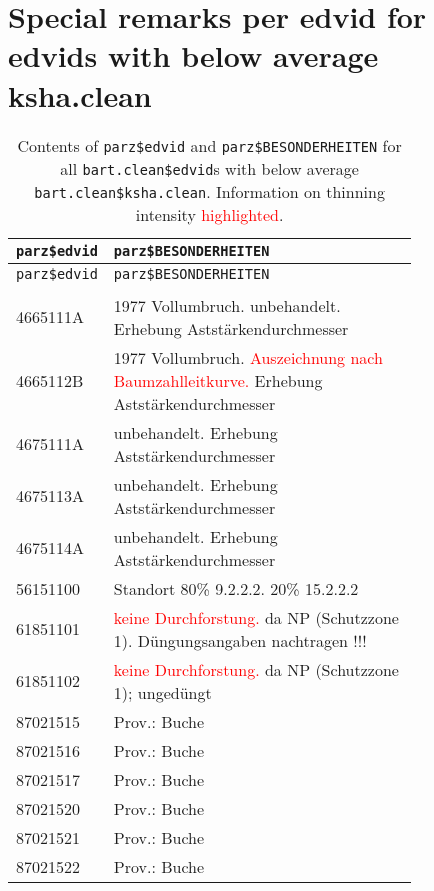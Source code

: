 \section{Special remarks per edvid for edvids with below average ksha.clean}

\begin{singlespace}
  {\tabulinesep=2mm
    \begin{longtabu}{l p{0.8\linewidth}}
      \caption{Contents of \texttt{parz\$edvid} and \texttt{parz\$BESONDERHEITEN} for all \texttt{bart.clean\$edvid}s with below average \texttt{bart.clean\$ksha.clean}.  Information on thinning intensity \textcolor{red}{highlighted}. \label{tab:special_remarks}} \\
      \toprule
      \texttt{parz\$edvid} & \texttt{parz\$BESONDERHEITEN} \\
      \midrule
      \endfirsthead
      \texttt{parz\$edvid} & \texttt{parz\$BESONDERHEITEN} \\
      \midrule
      \endhead
      \bottomrule
       & \\
      4665111A & 1977 Vollumbruch. unbehandelt. Erhebung Aststärkendurchmesser \\
      4665112B & 1977 Vollumbruch. \textcolor{red}{Auszeichnung nach Baumzahlleitkurve.} Erhebung Aststärkendurchmesser \\
      4675111A & unbehandelt. Erhebung Aststärkendurchmesser \\
      4675113A & unbehandelt. Erhebung Aststärkendurchmesser \\
      4675114A & unbehandelt. Erhebung Aststärkendurchmesser \\
      56151100 & Standort 80\% 9.2.2.2. 20\% 15.2.2.2 \\
      61851101 & \textcolor{red}{keine Durchforstung.} da NP (Schutzzone 1). Düngungsangaben nachtragen !!! \\
      61851102 & \textcolor{red}{keine Durchforstung.} da NP (Schutzzone 1); ungedüngt \\
      87021515 & Prov.: Buche \\
      87021516 & Prov.: Buche \\
      87021517 & Prov.: Buche \\
      87021520 & Prov.: Buche \\
      87021521 & Prov.: Buche \\
      87021522 & Prov.: Buche \\

\end{longtabu}}
\end{singlespace}
